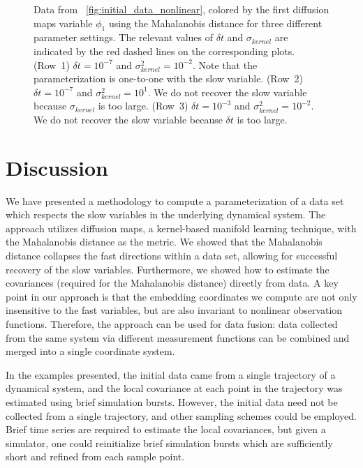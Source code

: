 \begin{figure}[t]
\caption[Analysis of nonlinear multiscale data for different parameter settings]{Data from \fig~\ref{fig:initial_data_nonlinear}, colored by the first diffusion maps variable $\phi_1$ using the Mahalanobis distance for three different parameter settings. The relevant values of $\delta t$ and $\sigma_{kernel}$ are indicated by the red dashed lines on the corresponding plots.  (Row~1) $\delta t = 10^{-7}$ and $\sigma_{kernel}^2 = 10^{-2}$. Note that the parameterization is one-to-one with the slow variable.  (Row~2) $\delta t = 10^{-7}$ and $\sigma_{kernel}^2 = 10^{1}$. We do not recover the slow variable because $\sigma_{kernel}$ is too large. (Row~3)  $\delta t = 10^{-3}$ and $\sigma_{kernel}^2 = 10^{-2}$. We do not recover the slow variable because $\delta t$ is too large.  }
\label{fig:colored_data_nonlinear_cases}
\end{figure}


\section{Discussion}

We have presented a methodology to compute a parameterization of a data set which respects the slow variables in the underlying dynamical system.
%
The approach utilizes diffusion maps, a kernel-based manifold learning technique, with the Mahalanobis distance as the metric.
%
We showed that the Mahalanobis distance collapses the fast directions within a data set, allowing for successful recovery of the slow variables.
%
Furthermore, we showed how to estimate the covariances (required for the Mahalanobis distance) directly from data.
%
A key point in our approach is that the embedding coordinates we compute are not only insensitive to the fast variables, but are also invariant to nonlinear observation functions.
%
Therefore, the approach can be used for data fusion: data collected from the same system via different measurement functions can be combined and merged into a single coordinate system.

In the examples presented, the initial data came from a single trajectory of a dynamical system, and the local covariance at each point in the trajectory was estimated using brief simulation bursts.
%
However, the initial data need not be collected from a single trajectory, and other sampling schemes could be employed.
%
Brief time series are required to estimate the local covariances, but given a simulator, one could reinitialize brief simulation bursts which are sufficiently short and refined from each sample point.

